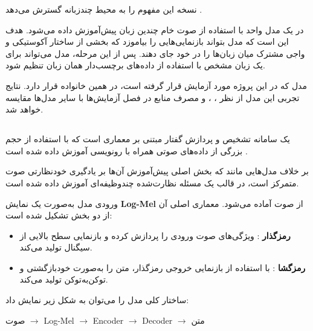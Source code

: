 نسخه
این مفهوم را به محیط چندزبانه گسترش می‌دهد
\cite{conneau2020xlsr}.

در  یک مدل واحد با استفاده از صوت خام چندین زبان
پیش‌آموزش داده می‌شود.
هدف این است که مدل بتواند بازنمایی‌هایی را بیاموزد که بخشی از
ساختار آکوستیکی و واجی مشترک میان زبان‌ها را در خود جای دهند.
پس از این مرحله، مدل می‌تواند برای یک زبان مشخص با استفاده از
داده‌های برچسب‌دار همان زبان تنظیم شود.

مدل
که در این پروژه مورد آزمایش قرار گرفته است، در همین خانواده
قرار دارد.
نتایج تجربی این مدل از نظر
، ، 
و مصرف منابع در فصل آزمایش‌ها با سایر مدل‌ها مقایسه خواهد شد.


\subsection{}

یک سامانه تشخیص و پردازش گفتار مبتنی بر معماری
است که با استفاده از حجم بزرگی از داده‌های صوتی همراه با
رونویسی آموزش داده شده است
\cite{radford2022whisper}.

بر خلاف مدل‌هایی مانند  که بخش اصلی
پیش‌آموزش آن‌ها بر یادگیری خودنظارتی صوت متمرکز است،
در قالب یک مسئله نظارت‌شده چندوظیفه‌ای آموزش داده شده است.

ورودی مدل به‌صورت یک نمایش
\textbf{Log-Mel }
از صوت آماده می‌شود.
معماری اصلی آن از دو بخش تشکیل شده است:

\begin{itemize}

    \item
    \textbf{رمزگذار}
    :
    ویژگی‌های صوت ورودی را پردازش کرده و بازنمایی سطح بالایی
    از سیگنال تولید می‌کند.

    \item
    \textbf{رمزگشا}
    :
    با استفاده از بازنمایی خروجی رمزگذار، متن را به‌صورت
    خودبازگشتی و توکن‌به‌توکن تولید می‌کند.

\end{itemize}

ساختار کلی مدل را می‌توان به شکل زیر نمایش داد:

\begin{center}
صوت
$\longrightarrow$
Log-Mel 
$\longrightarrow$
 Encoder
$\longrightarrow$
 Decoder
$\longrightarrow$
متن
\end{center}

